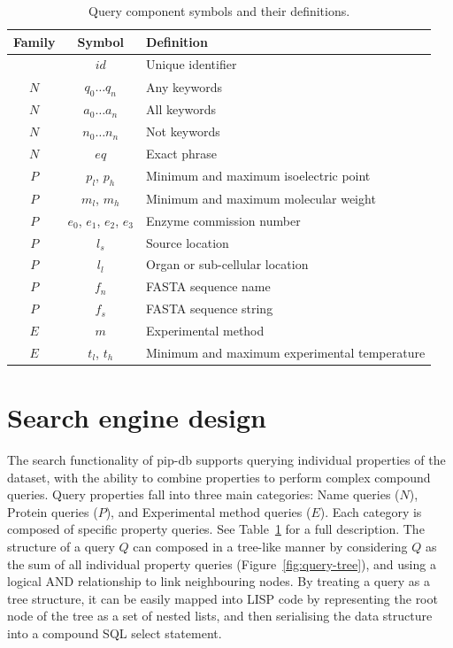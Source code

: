 \begin{table}[H]
\centering
\begin{tabular}{| c | c | l |}
\hline
\textbf{Family} & \textbf{Symbol} & \textbf{Definition}\\
\hline
& $id$ & Unique identifier\\
$N$ & $q_0 \ldots q_n$ & Any keywords\\
$N$ & $a_0 \ldots a_n$ & All keywords\\
$N$ & $n_0 \ldots n_n$ & Not keywords\\
$N$ & $eq$ & Exact phrase\\
$P$ & $p_l$, $p_h$ & Minimum and maximum isoelectric point\\
$P$ & $m_l$, $m_h$ & Minimum and maximum molecular weight\\
$P$ & $e_0$, $e_1$, $e_2$, $e_3$ & Enzyme commission number\\
$P$ & $l_s$ & Source location\\
$P$ & $l_l$ & Organ or sub-cellular location\\
$P$ & $f_n$ & FASTA sequence name\\
$P$ & $f_s$ & FASTA sequence string\\
$E$ & $m$ & Experimental method\\
$E$ & $t_l$, $t_h$ & Minimum and maximum experimental temperature\\
\hline
\end{tabular}
\caption[Query component symbols and their definitions]{Query component symbols and their definitions.}
\label{tab:query-components}
\end{table}


\newpage
\section{Search engine design}\label{sec:search-engine}

The search functionality of pip-db supports querying individual
properties of the dataset, with the ability to combine properties to
perform complex compound queries. Query properties fall into three
main categories: Name queries ($N$), Protein queries ($P$), and
Experimental method queries ($E$). Each category is composed of
specific property queries. See Table~\ref{tab:query-components} for a
full description. The structure of a query $Q$ can composed in a
tree-like manner by considering $Q$ as the sum of all individual
property queries (Figure~\ref{fig:query-tree}), and using a logical
AND relationship to link neighbouring nodes. By treating a query as a
tree structure, it can be easily mapped into LISP code by representing
the root node of the tree as a set of nested lists, and then
serialising the data structure into a compound SQL select statement.

